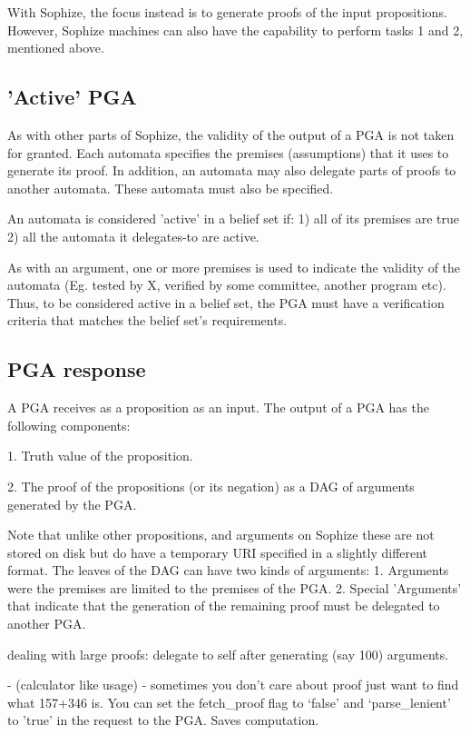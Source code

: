 \documentclass[a4paper]{article}
\begin{document}
With Sophize, the focus instead is to generate proofs of the input propositions. However, Sophize machines can also have the capability to perform tasks 1 and 2, mentioned above.

\subsection{'Active' PGA}
As with other parts of Sophize, the validity of the output of a PGA is not taken for granted. Each automata specifies the premises (assumptions) that it uses to generate its proof. In addition, an automata may also delegate parts of proofs to another automata. These automata must also be specified. 

An automata is considered 'active' in a belief set if:
1) all of its premises are true
2) all the automata it delegates-to are active.

As with an argument, one or more premises is used to indicate the validity of the automata (Eg. tested by X, verified by some committee, another program etc). Thus, to be considered active in a belief set, the PGA must have a verification criteria that matches the belief set's requirements.

\subsection{PGA response}
A PGA receives as a proposition as an input. The output of a PGA has the following components:

1. Truth value of the proposition.

2. The proof of the propositions (or its negation) as a DAG of arguments generated by the PGA. 

Note that unlike other propositions, and arguments on Sophize these are not stored on disk but do have a temporary URI specified in a slightly different format. The leaves of the DAG can have two kinds of arguments:
1. Arguments were the premises are limited to the premises of the PGA.
2. Special 'Arguments' that indicate that the generation of the remaining proof must be delegated to another PGA.

dealing with large proofs: delegate to self after generating (say 100) arguments.

- (calculator like usage) - sometimes you don't care about proof just want to find what 157+346 is. You can set the fetch\_proof flag to `false' and `parse\_lenient' to 'true' in the request to the PGA. Saves computation. 
\end{document}
